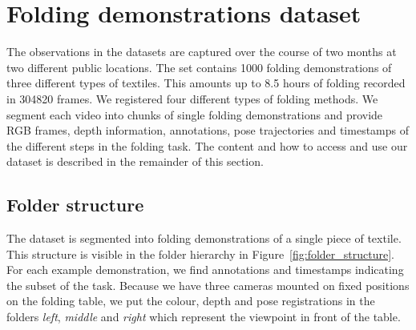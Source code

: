 \documentclass[\home/main.tex]{subfiles}
\begin{document}

\section{Folding demonstrations dataset}

The observations in the datasets are captured over the course of two months at two different public locations. The set contains \qty{1000}{} folding demonstrations of three different types of textiles. This amounts up to \qty{8.5}{} hours of folding recorded in \qty{304820}{} frames. We registered four different types of folding methods. We segment each video into chunks of single folding demonstrations and provide RGB frames, depth information, annotations, pose trajectories and timestamps of the different steps in the folding task. The content and how to access and use our dataset is described in the remainder of this section.

\subsection{Folder structure}
The dataset is segmented into folding demonstrations of a single piece of textile. This structure is visible in the folder hierarchy in Figure~\ref{fig:folder_structure}. For each example demonstration, we find annotations and timestamps indicating the subset of the task. Because we have three cameras mounted on fixed positions on the folding table, we put the colour, depth and pose registrations in the folders \textit{left}, \textit{middle} and \textit{right} which represent the viewpoint in front of the table.
\end{document}
